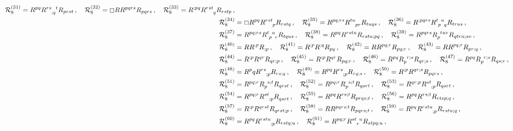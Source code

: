 \documentclass[11pt]{article}
\begin{document}
{\begin{align}
\quad 
\mathcal{R}_{8}^{(31)} = R^{pq} \tensor{R}{^{rs}_{;q}^t} R_{prst} \, ,
\quad 
\mathcal{R}_{8}^{(32)} = \Box R R^{pqrs} R_{pqrs} \, ,
\quad 
\mathcal{R}_{8}^{(33)} = R^{;pq} \tensor{R}{^{rst}_q} R_{rstp} \, ,
\nonumber\\
\mathcal{R}_{8}^{(34)} &= \Box R^{pq} \tensor{R}{^{rst}_p} R_{rstq} \, ,
\quad 
\mathcal{R}_{8}^{(35)} = R^{pq;rs} \tensor{R}{^{tu}_{pr}} R_{tuqs} \, ,
\quad
\mathcal{R}_{8}^{(36)} = R^{;pqrs} \tensor{R}{^t_p^u_q}R_{trus} \, , 
\nonumber\\
\mathcal{R}_{8}^{(37)} &= R^{pq;rs} \tensor{R}{^t_p^u_r} R_{tqus} \, ,
\quad
\mathcal{R}_{8}^{(38)} = R^{pq} R^{rstu} R_{rstu;pq} \, ,
\quad
\mathcal{R}_{8}^{(39)} = R^{pqrs} \tensor{R}{_p^{tuv}} R_{qtru;sv} \, ,
\nonumber\\
\mathcal{R}_{8}^{(40)} &= R R^{;p} R_{;p} \, , 
\quad 
\mathcal{R}_{8}^{(41)} = R^{;p} R^{;q} R_{pq} \, ,
\quad
\mathcal{R}_{8}^{(42)} = R R^{pq;r} R_{pq;r} \, ,
\quad
\mathcal{R}_{8}^{(43)} = R R^{pq;r} R_{pr;q} \, ,
\nonumber\\
\mathcal{R}_{8}^{(44)} &= R^{;p} R^{qr} R_{qr;p} \, ,
\quad
\mathcal{R}_{8}^{(45)} = R^{;p} R^{qr} R_{pq;r} \, ,
\quad 
\mathcal{R}_{8}^{(46)} = R^{pq} \tensor{R}{_p^{r;s}} R_{qr;s} \,,
\quad 
\mathcal{R}_{8}^{(47)} = R^{pq} \tensor{R}{_p^{r;s}} R_{qs;r} \, ,
\nonumber\\
\mathcal{R}_{8}^{(48)} &=  R{^pq} \tensor{R}{^{rs}_{;p}} R_{rs;q} \, , 
\quad 
\mathcal{R}_{8}^{(49)} = R^{pq} \tensor{R}{^{rs}_{;p}} R_{rq;s} \, , 
\quad
\mathcal{R}_{8}^{(50)} = R^{;p} R^{qr;s} R_{pqrs} \, ,
\nonumber\\
\mathcal{R}_{8}^{(51)} &=   R^{pq;r} \tensor{R}{_p^{s;t}} R_{qrst} \, ,
\quad
\mathcal{R}_{8}^{(52)} = R^{pq;r} \tensor{R}{_p^{s;t}} R_{qsrt} \, ,
\quad
\mathcal{R}_{8}^{(53)} = R^{qr;p} \tensor{R}{^{st}_{;p}} R_{qsrt} \,,
\nonumber\\
\mathcal{R}_{8}^{(54)} &= R^{pq;r} \tensor{R}{^{st}_{;p}} \tensor{R}{_{qsrt}}  \, , 
\quad
\mathcal{R}_{8}^{(55)} =  R^{pq} R^{rs;t} R_{prqs;t} \, ,
\quad
\mathcal{R}_{8}^{(56)} =  R^{pq}R^{rs;t} R_{rtsp;q} \, ,
\nonumber\\
\mathcal{R}_{8}^{(57)} &=  R^{;p} R^{qrst} R_{qrst;p} \, ,
\quad
\mathcal{R}_{8}^{(58)} = R R^{pqrs;t} R_{pqrs;t} \, ,
\quad 
\mathcal{R}_{8}^{(59)} = R^{pq} \tensor{R}{^{rstu}_{;p}} R_{rstu;q} \, ,
\nonumber\\
\mathcal{R}_{8}^{(60)} &= R^{pq} \tensor{R}{^{rstu}_{;p}} R_{rstq;u} \, ,
\quad
\mathcal{R}_{8}^{(61)} = R^{pq;r} \tensor{R}{^{st}_r^u} R_{stpq;u} \, ,
\quad

\end{align}}
\end{document}
